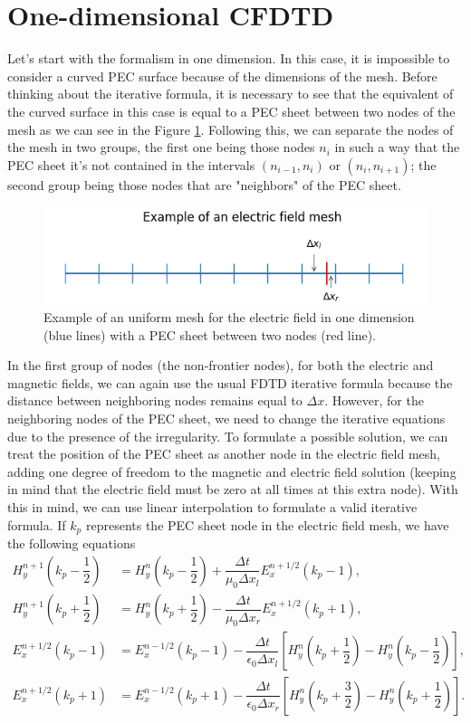 \documentclass[12pt, oneside]{book}
\begin{document}
\section{One-dimensional CFDTD}
Let's start with the formalism in one dimension. In this case, it is impossible to consider a curved PEC surface because of the dimensions of the mesh. Before thinking about the iterative formula, it is necessary to see that the equivalent of the curved surface in this case is equal to a PEC sheet between two nodes of the mesh as we can see in the Figure \ref{fig:Mesh1D_CFDTD}. Following this, we can separate the nodes of the mesh in two groups, the first one being those nodes $n_i$ in such a way that the PEC sheet it's not contained in the intervals $(n_{i-1}, n_i)$ or $(n_i, n_{i+1})$; the second group being those nodes that are "neighbors" of the PEC sheet. 
\begin{figure}[H]
    \centering
    \includegraphics[scale=1]{Imagenes/Mesh1D_CFDTD.png}
    \caption{Example of an uniform mesh for the electric field in one dimension (blue lines) with a PEC sheet between two nodes (red line).}
    \label{fig:Mesh1D_CFDTD}
\end{figure}
In the first group of nodes (the non-frontier nodes), for both the electric and magnetic fields, we can again use the usual FDTD iterative formula because the distance between neighboring nodes remains equal to $\Delta x$. However, for the neighboring nodes of the PEC sheet, we need to change the iterative equations due to the presence of the irregularity. To formulate a possible solution, we can treat the position of the PEC sheet as another node in the electric field mesh, adding one degree of freedom to the magnetic and electric field solution (keeping in mind that the electric field must be zero at all times at this extra node). With this in mind, we can use linear interpolation to formulate a valid iterative formula. If $k_p$ represents the PEC sheet node in the electric field mesh, we have the following equations
\begin{align}
    H_y^{n+1} \left( k_p - \dfrac{1}{2} \right) &= H_y^{n} \left( k_p - \dfrac{1}{2} \right) + \dfrac{\Delta t}{\mu_0 \Delta x_l}E_x^{n+1/2}(k_p - 1), \\
    H_y^{n+1} \left( k_p + \dfrac{1}{2} \right) &= H_y^{n} \left( k_p + \dfrac{1}{2} \right) - \dfrac{\Delta t}{\mu_0 \Delta x_r}E_x^{n+1/2}(k_p + 1), \\
    E_x^{n+1/2}(k_p - 1) &= E_x^{n-1/2}(k_p - 1) - \dfrac{\Delta t}{\epsilon_0 \Delta x_l} \left[  H_y^{n} \left( k_p + \dfrac{1}{2} \right) -  H_y^{n} \left( k_p - \dfrac{1}{2} \right) \right], \\
    E_x^{n+1/2}(k_p + 1) &= E_x^{n-1/2}(k_p + 1) - \dfrac{\Delta t}{\epsilon_0 \Delta x_r} \left[  H_y^{n} \left( k_p + \dfrac{3}{2} \right) -  H_y^{n} \left( k_p + \dfrac{1}{2} \right) \right].
\end{align}
\end{document}
